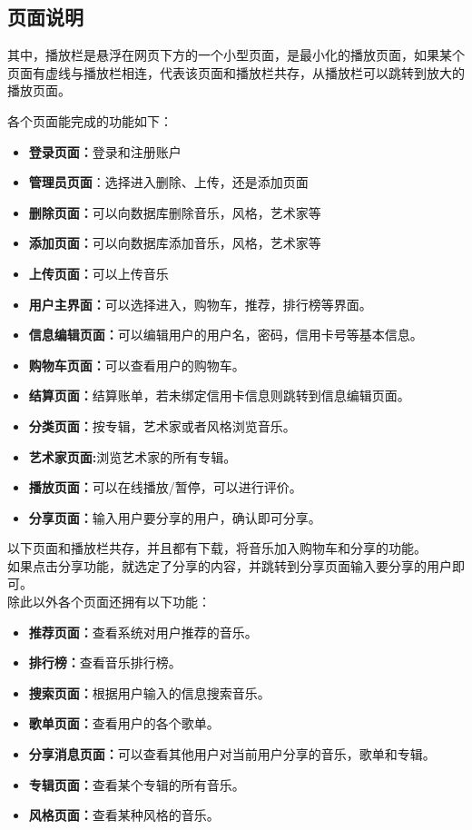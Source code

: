 	
\subsection{页面说明}
其中，播放栏是悬浮在网页下方的一个小型页面，是最小化的播放页面，如果某个页面有虚线与播放栏相连，代表该页面和播放栏共存，从播放栏可以跳转到放大的播放页面。


各个页面能完成的功能如下：
\begin{itemize}
	\item \textbf{登录页面：}登录和注册账户
	\item \textbf{管理员页面}：选择进入删除、上传，还是添加页面
	\item \textbf{删除页面：}可以向数据库删除音乐，风格，艺术家等
	\item \textbf{添加页面：}可以向数据库添加音乐，风格，艺术家等
	\item \textbf{上传页面：}可以上传音乐
	\item \textbf{用户主界面：}可以选择进入，购物车，推荐，排行榜等界面。
	\item \textbf{信息编辑页面：}可以编辑用户的用户名，密码，信用卡号等基本信息。
	\item \textbf{购物车页面：}可以查看用户的购物车。
	\item \textbf{结算页面：}结算账单，若未绑定信用卡信息则跳转到信息编辑页面。
	\item \textbf{分类页面：}按专辑，艺术家或者风格浏览音乐。
	\item \textbf{艺术家页面:}浏览艺术家的所有专辑。
	\item \textbf{播放页面：}可以在线播放/暂停，可以进行评价。
	\item \textbf{分享页面：}输入用户要分享的用户，确认即可分享。
\end{itemize}
以下页面和播放栏共存，并且都有下载，将音乐加入购物车和分享的功能。\\
如果点击分享功能，就选定了分享的内容，并跳转到分享页面输入要分享的用户即可。\\
除此以外各个页面还拥有以下功能：
\begin{itemize}
\item \textbf{推荐页面：}查看系统对用户推荐的音乐。
\item \textbf{排行榜：}查看音乐排行榜。
\item \textbf{搜索页面：}根据用户输入的信息搜索音乐。
\item \textbf{歌单页面：}查看用户的各个歌单。
\item \textbf{分享消息页面：}可以查看其他用户对当前用户分享的音乐，歌单和专辑。
\item \textbf{专辑页面：}查看某个专辑的所有音乐。
\item \textbf{风格页面：}查看某种风格的音乐。
\end{itemize}

